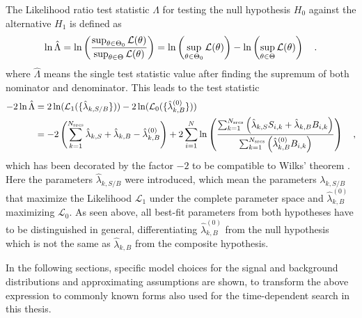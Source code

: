 The Likelihood ratio test statistic $\Lambda$ for testing the null hypothesis $H_0$ against the alternative $H_1$ is defined as 
\begin{equation}
  \ln\hat{\Lambda}
  = \ln\left(\frac{\sup_{\theta \in \Theta_0} \mathcal{L}(\theta)}
                  {\sup_{\theta \in \Theta} \mathcal{L}(\theta)}\right)
  = \ln\left(\sup_{\theta \in \Theta_0} \mathcal{L}(\theta)\right) -
    \ln\left(\sup_{\theta \in \Theta} \mathcal{L}(\theta)\right)
  \quad\text{.}
\end{equation}
where $\hat{\Lambda}$ means the single test statistic value after finding the supremum of both nominator and denominator.
This leads to the test statistic
\begin{equation}
  \begin{aligned}
    -2\ln\hat{\Lambda}
    &= 2\ln(\mathcal{L}_1(\{\hat{\lambda}_{k,S/B}\})) -
       2\ln(\mathcal{L}_0(\{\hat{\lambda}^{(0)}_{k,B}\})) \\
    &= -2\left(\sum_{k=1}^{N_\text{srcs}}\hat{\lambda}_{k,S} +
                                         \hat{\lambda}_{k,B} -
                                         \hat{\lambda}_{k,B}^{(0)}\right) +
      2\sum_{i=1}^N \ln\left(
        \frac{\sum_{k=1}^{N_\text{srcs}}\left(
            \hat{\lambda}_{k,S} S_{i,k}+\hat{\lambda}_{k,B} B_{i,k}\right)}
            {\sum_{k=1}^{N_\text{srcs}}\left(
              \hat{\lambda}_{k,B}^{(0)} B_{i,k}
            \right)}
          \right)
    \quad\text{,}
  \end{aligned}
\end{equation}
which has been decorated by the factor $-2$ to be compatible to Wilks' theorem .
Here the parameters $\hat{\lambda}_{k,S/B}$ were introduced, which mean the parameters $\lambda_{k,S/B}$ that maximize the Likelihood $\mathcal{L}_1$ under the complete parameter space and $\hat{\lambda}_{k,B}^{(0)}$ maximizing $\mathcal{L}_0$.
As seen above, all best-fit parameters from both hypotheses have to be distinguished in general, differentiating $\hat{\lambda}_{k,B}^{(0)}$ from the null hypothesis which is not the same as $\hat{\lambda}_{k,B}$ from the composite hypothesis.

In the following sections, specific model choices for the signal and background distributions and approximating assumptions are shown, to transform the above expression to commonly known forms also used for the time-dependent search in this thesis.


